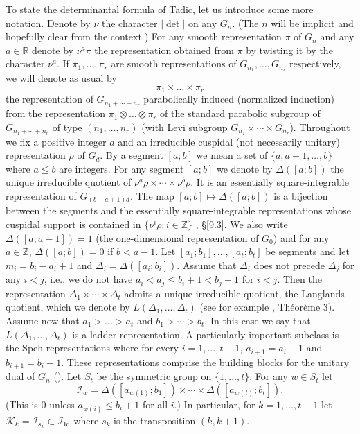 \documentclass[a4paper,12pt,leqno]{amsart}
\newcommand{\bbR}{\mathbb{R}}
\newcommand{\bbZ}{\mathbb{Z}}
\newcommand{\caI}{\mathcal{I}}
\newcommand{\caK}{\mathcal{K}}
\theoremstyle{plain}
\theoremstyle{definition}
\theoremstyle{definition}
\newcommand{\Id}{\mathrm{Id}}
\begin{document}
To state the determinantal formula of Tadic, let us introduce some more notation. Denote by  $\nu$
the character
$\vert\det \vert$  on any $G_n$. (The $n$ will be implicit and hopefully clear from the context.) For any
smooth representation $\pi$ of $G_n$  and any $a\in \bbR$ denote by $\nu^a  \pi$ the representation
obtained from $\pi$
by twisting it by the character $\nu^a$. If $\pi_1, \ldots ,  \pi_r$ are  smooth representations of
 $G_{n_1}, \ldots ,G_{n_r}$ respectively, we will denote as usual by
\[\pi_1\times \ldots \times \pi_r\]
the representation of $ G_{n_1+\cdots +n_r}$ parabolically induced (normalized induction) from the
representation
$\pi_1\otimes \ldots \otimes \pi_r$ of the standard parabolic subgroup of $G_{n_1+\cdots +n_r}$ of
type $(n_1,\ldots, n_r)$ (with Levi subgroup   $G_{n_1}\times \cdots \times G_{n_r}$).
Throughout we  fix a positive integer $d$ and an irreducible cuspidal (not necessarily unitary) representation
$\rho$ of $G_d$.  By a segment $[a;b]$  we mean a set of $\{a,a+1,\ldots , b\}$ where $a\leq b$ are integers.
For any segment   $[a;b]$   we denote by $\Delta([a;b])$  the unique irreducible quotient of
 $\nu^a\rho\times \cdots \times \nu^b\rho$.
 It is an essentially square-integrable representation of $G_{(b-a+1)d}$. The map $[a;b]\mapsto
 \Delta([a;b])$ is a bijection
 between the segments and the essentially square-integrable representations whose cuspidal support
 is contained
in $\{ \nu^i \rho: i\in \bbZ\}$
\cite{Zel80}, \S[9.3]. We also write $\Delta([a; a-1]) = 1$ (the one-dimensional representation of $G_0$)
and for any $a\in \bbZ$, $\Delta([a; b]) = 0$  if $b < a-1$.
Let   $[a_1;b_1],\ldots ,[a_t;b_t]$  be segments and let $m_i=b_i-a_i+1$ and $\Delta_i=\Delta([a_i;b_i])$.
 Assume that $\Delta_i$  does not precede $\Delta_j$
for any $i<j$, i.e., we do not have  $a_i<a_j\leq b_i+1<b_j+1$ for $i<j$. Then the
representation  $\Delta_1\times \cdots \times \Delta_t$ admits a unique irreducible quotient, the
Langlands quotient,
which we denote by $L(\Delta_1,\ldots ,\Delta_t) $ (see for example \cite{Rod82}, Th{\' e}or{\`e}me 3).
Assume now that $a_1>\ldots  >a_t$ and $b_1>\cdots >b_t$. In this case we say that
$L(\Delta_1,\ldots ,\Delta_t) $ is a
 ladder representation.
 A particularly important subclass is the Speh representations where for every $i=1,\ldots,t-1$,
 $a_{i+1}=a_i-1$ and $b_{i+1}=b_i-1$.
These representations comprise the building blocks for the unitary dual of $G_n$ (\cite{Tad86}).
Let $S_t$  be the symmetric group on $\{1,\ldots, t\}$. For any  $w\in S_t$ let
\[\caI_w = \Delta([a_{w(1)}; b_1])\times \cdots \times \Delta([a_{w(t)}; b_t]).\]
(This is $0$ unless $a_{w(i)}\leq b_i+1$ for all $i$.) In particular, for $k=1, \ldots ,t-1$ let $\caK_k =
 \caI_{s_k}\subset \caI_{\Id}$
where $s_k$  is the transposition $(k,k + 1)$.
\end{document}
